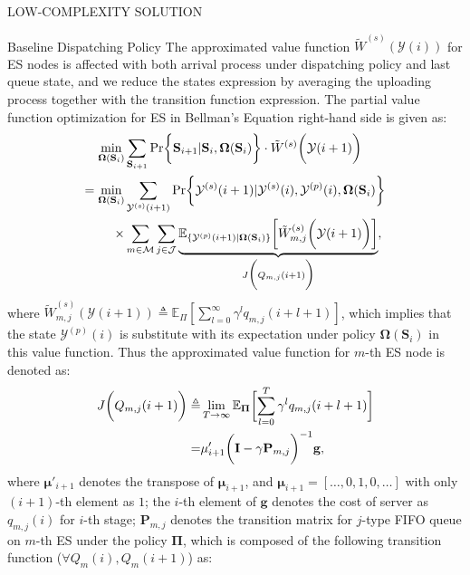 \documentclass[10pt, conference, letterpaper]{IEEEtran}
\newcommand{\mat}{\mathbf}
\newcommand{\define}{\triangleq}
\renewcommand{\vec}{\mathbf}
\DeclarePairedDelimiter{\set}{\{}{\}}
\DeclarePairedDelimiter{\Paren}{\bigg(}{\bigg)}
\DeclarePairedDelimiter{\Bracket}{\bigg[}{\bigg]}
\DeclarePairedDelimiter{\Brace}{\bigg\{}{\bigg\}}
\newcommand{\esSet}{\mathcal{M}}
\newcommand{\jSpace}{\mathcal{J}}
\newcommand{\Stat}{\mathbf{S}}
\newcommand{\Obsv}{\mathcal{Y}}
\newcommand{\Policy}{\boldsymbol{\Omega}}
\newcommand{\BPolicy}{\Policy} %
\begin{document}
\begin{section}{LOW-COMPLEXITY SOLUTION}
\begin{subsection}{Baseline Dispatching Policy}
            The approximated value function $\tilde{W}^{(s)}(\Obsv(i))$ for ES nodes is affected with both arrival process under dispatching policy and last queue state, and we reduce the states expression by averaging the uploading process together with the transition function expression.
            The partial value function optimization for ES in Bellman's Equation right-hand side is given as:
            \begin{align}
                \min_{\BPolicy(\Stat_i)}& \sum_{\Stat_{i+1}}
                    \Pr\Brace{\Stat_{i+1}|\Stat_{i}, \BPolicy(\Stat_i)} \cdot \tilde{W}^{(s)}\Paren{\Obsv(i+1)}
                \nonumber\\
                = \min_{\BPolicy(\Stat_i)}& \sum_{\Obsv^{(s)}(i+1)}
                    \Pr\Brace{\Obsv^{(s)}(i+1)|\Obsv^{(s)}(i), \Obsv^{(p)}(i), \BPolicy(\Stat_i)}
                    \nonumber\\
                    \times& \sum_{m\in\esSet} \sum_{j\in\jSpace}
                        \underbrace{
                            \mathbb{E}_{\set{\Obsv^{(p)}(i+1)|\BPolicy(\Stat_i)}} \Bracket{\tilde{W}^{(s)}_{m,j}\Paren{\Obsv(i+1)}}
                        }_{
                            J\Paren{Q_{m,j}(i+1)}
                        },
            \end{align}
            where $\tilde{W}^{(s)}_{m,j}(\Obsv(i+1)) \define \mathbb{E}_{\Pi}[\sum_{l=0}^{\infty} \gamma^{l} q_{m,j}(i+l+1)]$, which implies that the state $\Obsv^{(p)}(i)$ is substitute with its expectation under policy $\BPolicy(\Stat_i)$ in this value function.
            Thus the approximated value function for $m$-th ES node is denoted as:
            \begin{align}
                J\Paren{Q_{m,j}(i+1)} \define& \lim_{T\to\infty}
                    \mathbb{E}_{\vec{\Pi}} \Bracket{\sum_{l=0}^{T} \gamma^{l} q_{m,j}(i+l+1)}
                \nonumber\\
                =& \vec{\mu}'_{i+1} \Paren{ \mat{I}-\gamma\mat{P}_{m,j} }^{-1} \vec{g},
            \end{align}
            where $\vec{\mu}'_{i+1}$ denotes the transpose of $\vec{\mu}_{i+1}$, and $\vec{\mu}_{i+1} = [\dots,0,1,0,\dots]$ with only $(i+1)$-th element as $1$; the $i$-th element of $\vec{g}$ denotes the cost of server as $q_{m,j}(i)$ for $i$-th stage; $\mat{P}_{m,j}$ denotes the transition matrix for $j$-type FIFO queue on $m$-th ES under the policy $\vec{\Pi}$, which is composed of the following transition function ($\forall Q_m(i),Q_m(i+1)$) as:

\end{subsection}
\end{section}
\end{document}
